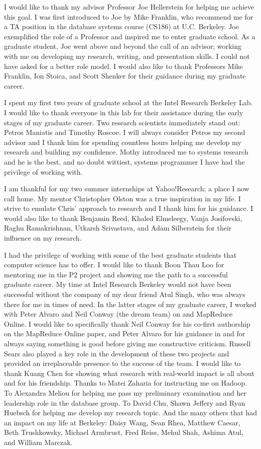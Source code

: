 
I would like to thank my advisor Professor Joe Hellerstein for helping me
achieve this goal.  I was first introduced to Joe by Mike Franklin, who
recommend me for a TA position in the database systems course (CS186) at U.C.\@
Berkeley.  Joe exemplified the role of a Professor and inspired me to enter
graduate school.  As a graduate student, Joe went above and beyond the call of
an advisor; working with me on developing my research, writing, and
presentation skills.  I could not have asked for a better role model.  I would
also like to thank Professors Mike Franklin, Ion Stoica, and Scott Shenker for
their guidance during my graduate career.

I spent my first two years of graduate school at the Intel Research Berkeley
Lab.  I would like to thank everyone in this lab for their assistance during
the early stages of my graduate career.  Two research scientists immediately
stand out: Petros Maniatis and Timothy Roscoe.  I will always consider Petros
my second advisor and I thank him for spending countless hours helping me
develop my research and building my confidence.  Mothy introduced me to systems
research and he is the best, and no doubt wittiest, systems programmer I have
had the privilege of working with.

I am thankful for my two summer internships at Yahoo!\@ Research; a place I now
call home.  My mentor Christopher Olston was a true inspiration in my life.  I
strive to emulate Chris' approach to research and I thank him for his guidance.
I would also like to thank Benjamin Reed, Khaled Elmeleegy, Vanja Josifovski,
Raghu Ramakrishnan, Utkarsh Srivastava, and Adam Silberstein for their
influence on my research.

I had the privilege of working with some of the best graduate students that
computer science has to offer.  I would like to thank Boon Thau Loo for
mentoring me in the P2 project and showing me the path to a successful graduate
career.  My time at Intel Research Berkeley would not have been successful
without the company of my dear friend Atul Singh, who was always there for me
in times of need.  In the latter stages of my graduate career, I worked with
Peter Alvaro and Neil Conway (the dream team) on \BOOMA and MapReduce Online.
I would like to specifically thank Neil Conway for his co-first authorship on
the MapReduce Online paper, and Peter Alvaro for his guidance in \BOOMA and for
always saying something is good before giving me constructive criticism.
Russell Sears also played a key role in the development of these two projects
and provided an irreplaceable presence to the success of the \BOOM team.  I
would like to thank Kuang Chen for showing what research with real-world impact
is all about and for his friendship.  Thanks to Matei Zaharia for instructing
me on Hadoop.  To Alexandra Meliou for helping me pass my preliminary
examination and her leadership role in the database group.  To David Chu, Shawn
Jeffery and Ryan Huebsch for helping me develop my research topic.  And the
many others that had an impact on my life at Berkeley: Daisy Wang, Sean Rhea,
Matthew Caesar, Beth Trushkowsky, Michael Armbrust, Fred Reiss, Mehul Shah,
Ashima Atul, and William Marczak.

